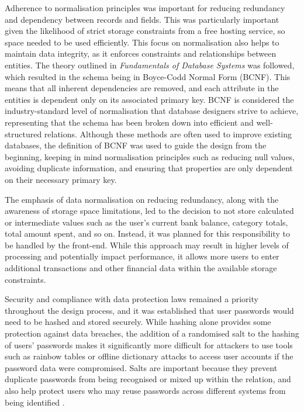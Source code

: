 \documentclass{l4proj}
\begin{document}
Adherence to normalisation principles was important for reducing redundancy and dependency between records and fields. This was particularly important given the likelihood of strict storage constraints from a free hosting service, so space needed to be used efficiently. This focus on normalisation also helps to maintain data integrity, as it enforces constraints and relationships between entities. The theory outlined in \citet{elmasri_fundamentals_2017} \textit{Fundamentals of Database Systems} was followed, which resulted in the schema being in Boyce-Codd Normal Form (BCNF). This means that all inherent dependencies are removed, and each attribute in the entities is dependent only on its associated primary key. BCNF is considered the industry-standard level of normalisation that database designers strive to achieve, representing that the schema has been broken down into efficient and well-structured relations. Although these methods are often used to improve existing databases, the definition of BCNF was used to guide the design from the beginning, keeping in mind normalisation principles such as reducing null values, avoiding duplicate information, and ensuring that properties are only dependent on their necessary primary key.

The emphasis of data normalisation on reducing redundancy, along with the awareness of storage space limitations, led to the decision to not store calculated or intermediate values such as the user’s current bank balance, category totals, total amount spent, and so on. Instead, it was planned for this responsibility to be handled by the front-end. While this approach may result in higher levels of processing and potentially impact performance, it allows more users to enter additional transactions and other financial data within the available storage constraints.

Security and compliance with data protection laws remained a priority throughout the design process, and it was established that user passwords would need to be hashed and stored securely. While hashing alone provides some protection against data breaches, the addition of a randomised salt to the hashing of users’ passwords makes it significantly more difficult for attackers to use tools such as rainbow tables or offline dictionary attacks to access user accounts if the password data were compromised. Salts are important because they prevent duplicate passwords from being recognised or mixed up within the relation, and also help protect users who may reuse passwords across different systems from being identified \citep{salomon_2018}.
\end{document}
